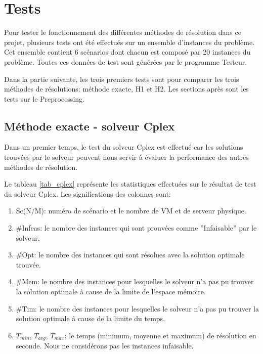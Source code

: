 \chapter{Tests}
Pour tester le fonctionnement des différentes méthodes de résolution dans ce projet, plusieurs tests ont été effectués sur un ensemble d'instances du problème. Cet ensemble contient 6 scénarios dont chacun est composé par 20 instances du problème. Toutes ces données de test sont générées par le programme Testeur.

Dans la partie suivante, les trois premiers tests sont pour comparer les trois méthodes de résolutions: méthode exacte, H1 et H2. Les sections après sont les tests sur le Preprocessing.

\section{Méthode exacte - solveur Cplex}
Dans un premier temps, le test du solveur Cplex est effectué car les solutions trouvées par le solveur peuvent nous servir à évaluer la performance des autres méthodes de résolution.

Le tableau \ref{tab_cplex} représente les statistiques effectuées sur le résultat de test du solveur Cplex. Les significations des colonnes sont:
\begin{enumerate}
	\item Sc(N/M): numéro de scénario et le nombre de VM et de serveur physique.
	\item \#Infeas: le nombre des instances qui sont prouvées comme ''Infaisable'' par le solveur.
	\item \#Opt: le nombre des instances qui sont résolues avec la solution optimale trouvée.
	\item \#Mem: le nombre des instances pour lesquelles le solveur n'a pas pu trouver la solution optimale à cause de la limite de l'espace mémoire.
	\item \#Tim: le nombre des instances pour lesquelles le solveur n'a pas pu trouver la solution optimale à cause de la limite du temps.
	\item $T_{min}$, $T_{avg}$, $T_{max}$: le temps (minimum, moyenne et maximum) de résolution en seconde. Nous ne considérons pas les instances infaisable.
\end{enumerate}
\bigskip

